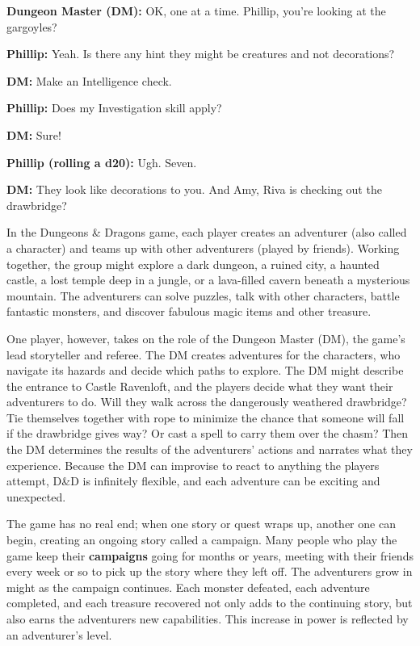 \begin{DndReadAloud}
  \par\textbf{Dungeon Master (DM):} OK, one at a time. Phillip, you’re looking at the gargoyles?
  \par\textbf{Phillip:} Yeah. Is there any hint they might be creatures and not decorations?
  \par\textbf{DM:} Make an Intelligence check.
  \par\textbf{Phillip:} Does my Investigation skill apply?
  \par\textbf{DM:} Sure!
  \par\textbf{Phillip (rolling a d20):} Ugh. Seven.
  \par\textbf{DM:} They look like decorations to you. And Amy, Riva is checking out the drawbridge?
\end{DndReadAloud}

In the Dungeons \& Dragons game, each player creates an adventurer (also called a character) and teams up with other adventurers (played by friends). Working together, the group might explore a dark dungeon, a ruined city, a haunted castle, a lost temple deep in a jungle, or a lava-filled cavern beneath a mysterious mountain. The adventurers can solve puzzles, talk with other characters, battle fantastic monsters, and discover fabulous magic items and other treasure.

One player, however, takes on the role of the Dungeon Master (DM), the game’s lead storyteller and referee. The DM creates adventures for the characters, who navigate its hazards and decide which paths to explore. The DM might describe the entrance to Castle Ravenloft, and the players decide what they want their adventurers to do. Will they walk across the dangerously weathered drawbridge? Tie themselves together with rope to minimize the chance that someone will fall if the drawbridge gives way? Or cast a spell to carry them over the chasm? Then the DM determines the results of the adventurers’ actions and narrates what they experience. Because the DM can improvise to react to anything the players attempt, D\&D is infinitely flexible, and each adventure can be exciting and unexpected.

The game has no real end; when one story or quest wraps up, another one can begin, creating an ongoing story called a campaign. Many people who play the game keep their \textbf{campaigns} going for months or years, meeting with their friends every week or so to pick up the story where they left off. The adventurers grow in might as the campaign continues. Each monster defeated, each adventure completed, and each treasure recovered not only adds to the continuing story, but also earns the adventurers new capabilities. This increase in power is reflected by an adventurer’s level.

